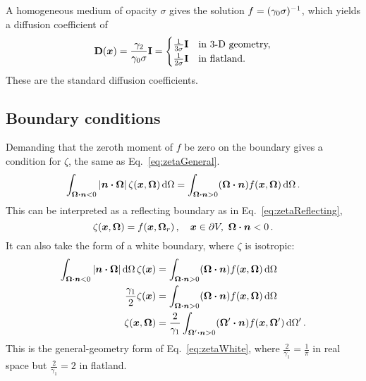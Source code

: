 A homogeneous medium of opacity $\sigma$ gives the solution
$f=(\gamma_0\sigma)^{-1}$, which yields a diffusion coefficient of
\begin{equation*}
  \mathbf{D}(\bm{x}) = \frac{\gamma_2}{\gamma_0 \sigma} \mathbf{I}
  =
  \begin{cases}
    \frac{1}{3\sigma} \mathbf{I} & \text{in 3-D geometry,} \\ 
    \frac{1}{2\sigma} \mathbf{I} & \text{in flatland.}
  \end{cases}
\end{equation*}
These are the standard diffusion coefficients.

\subsection{Boundary conditions}

Demanding that the zeroth moment of $f$ be zero on the boundary gives a
condition for $\zeta$, the same as Eq.~\eqref{eq:zetaGeneral}.
\begin{equation*}
  \int_{\bm{\Omega} \bm{\cdot} \bm{n} < 0}
  \left| \bm{n} \bm{\cdot} \bm{\Omega} \right| \zeta(\bm{x}, \bm{\Omega}) \mathop{}\!\mathrm{d}\Omega
  = \int_{\bm{\Omega} \bm{\cdot} \bm{n} > 0}
  (\bm{\Omega} \bm{\cdot} \bm{n} ) f(\bm{x}, \bm{\Omega}) \mathop{}\!\mathrm{d}\Omega\,.  
\end{equation*}
This can be interpreted as a reflecting boundary as in
Eq.~\eqref{eq:zetaReflecting}, 
\begin{equation*}
  \zeta(\bm{x}, \bm{\Omega}) = f(\bm{x}, \bm{\Omega}_r) \,,
 \quad \bm{x} \in \partial V, \ \bm{\Omega} \bm{\cdot} \bm{n} < 0 \,.
\end{equation*}
It can also take the form of a white boundary, where $\zeta$ is isotropic:
\begin{align*}
  \int_{\bm{\Omega} \bm{\cdot} \bm{n} < 0}
  \left| \bm{n} \bm{\cdot} \bm{\Omega} \right| \mathop{}\!\mathrm{d}\Omega\, \zeta(\bm{x}) 
  &= \int_{\bm{\Omega} \bm{\cdot} \bm{n} > 0}
  (\bm{\Omega} \bm{\cdot} \bm{n} ) f(\bm{x}, \bm{\Omega}) \mathop{}\!\mathrm{d}\Omega
  \\
  \frac{\gamma_1}{2} \zeta(\bm{x}) 
  &= \int_{\bm{\Omega} \bm{\cdot} \bm{n} > 0}
  (\bm{\Omega} \bm{\cdot} \bm{n} ) f(\bm{x}, \bm{\Omega}) \mathop{}\!\mathrm{d}\Omega
  \\
  \zeta(\bm{x},\bm{\Omega})
  &= \frac{2}{\gamma_1} \int_{\bm{\Omega}' \bm{\cdot} \bm{n} > 0}
  (\bm{\Omega}' \bm{\cdot} \bm{n} ) f(\bm{x}, \bm{\Omega}') \mathop{}\!\mathrm{d}\Omega'\,.
\end{align*}
This is the general-geometry form of Eq.~\eqref{eq:zetaWhite}, where
$\frac{2}{\gamma_1}=\frac{1}{\pi}$ in real space but $\frac{2}{\gamma_1}=2$ in
flatland.

